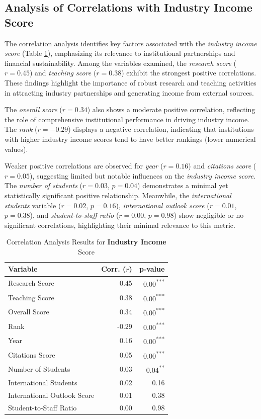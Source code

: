 \documentclass[sigconf]{acmart}
\begin{document}
\subsection{Analysis of Correlations with Industry Income Score}

The correlation analysis identifies key factors associated with the \textit{industry income score} (Table \ref{tab:correlation_industry_income}), emphasizing its relevance to institutional partnerships and financial sustainability. Among the variables examined, the \textit{research score} ($r = 0.45$) and \textit{teaching score} ($r = 0.38$) exhibit the strongest positive correlations. These findings highlight the importance of robust research and teaching activities in attracting industry partnerships and generating income from external sources.

The \textit{overall score} ($r = 0.34$) also shows a moderate positive correlation, reflecting the role of comprehensive institutional performance in driving industry income. The \textit{rank} ($r = -0.29$) displays a negative correlation, indicating that institutions with higher industry income scores tend to have better rankings (lower numerical values).

Weaker positive correlations are observed for \textit{year} ($r = 0.16$) and \textit{citations score} ($r = 0.05$), suggesting limited but notable influences on the \textit{industry income score}. The \textit{number of students} ($r = 0.03$, $p = 0.04$) demonstrates a minimal yet statistically significant positive relationship. Meanwhile, the \textit{international students} variable ($r = 0.02$, $p = 0.16$), \textit{international outlook score} ($r = 0.01$, $p = 0.38$), and \textit{student-to-staff ratio} ($r = 0.00$, $p = 0.98$) show negligible or no significant correlations, highlighting their minimal relevance to this metric.

\begin{table}[h!]
	\centering
	\caption{Correlation Analysis Results for \textbf{Industry Income} Score}
	\label{tab:correlation_industry_income}
	\begin{tabular}{|l|r|r|}
		\hline
		\textbf{Variable} & \textbf{Corr. ($r$)} & \textbf{p-value} \\
		\hline
		Research Score & 0.45 & 0.00\textsuperscript{***} \\
		Teaching Score & 0.38 & 0.00\textsuperscript{***} \\
		Overall Score & 0.34 & 0.00\textsuperscript{***} \\
		Rank & -0.29 & 0.00\textsuperscript{***} \\
		Year & 0.16 & 0.00\textsuperscript{***} \\
		Citations Score & 0.05 & 0.00\textsuperscript{***} \\
		Number of Students & 0.03 & 0.04\textsuperscript{**} \\
		International Students & 0.02 & 0.16 \\
		International Outlook Score & 0.01 & 0.38 \\
		Student-to-Staff Ratio & 0.00 & 0.98 \\
		\hline
	\end{tabular}
\end{table}
\end{document}
